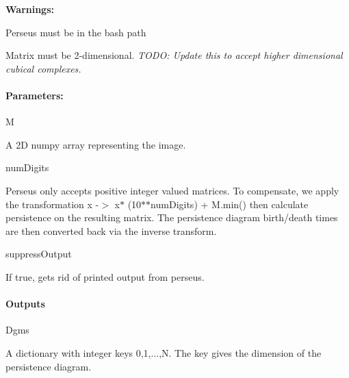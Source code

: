 {\bfseries Warnings\+:}


\begin{DoxyEnumerate}
\item Perseus must be in the bash path
\item Matrix must be 2-\/dimensional. {\itshape T\+O\+DO\+: Update this to accept higher dimensional cubical complexes.}
\end{DoxyEnumerate}

\paragraph*{Parameters\+:}


\begin{DoxyItemize}
\item M
\begin{DoxyItemize}
\item A 2D numpy array representing the image.
\end{DoxyItemize}
\item num\+Digits
\begin{DoxyItemize}
\item Perseus only accepts positive integer valued matrices. To compensate, we apply the transformation {\ttfamily x -\/$>$ x$\ast$ (10$\ast$$\ast$num\+Digits) + M.\+min()} then calculate persistence on the resulting matrix. The persistence diagram birth/death times are then converted back via the inverse transform.
\end{DoxyItemize}
\item suppress\+Output
\begin{DoxyItemize}
\item If true, gets rid of printed output from perseus.
\end{DoxyItemize}
\end{DoxyItemize}

\paragraph*{Outputs}


\begin{DoxyItemize}
\item Dgms
\begin{DoxyItemize}
\item A dictionary with integer keys 0,1,...,N. The key gives the dimension of the persistence diagram. 

 
\end{DoxyItemize}
\end{DoxyItemize}